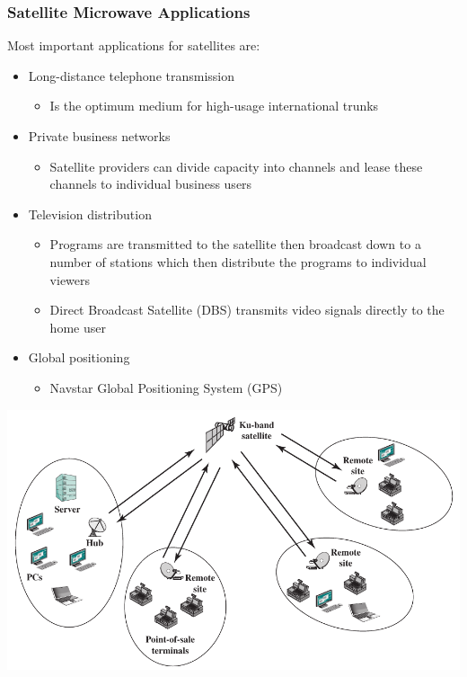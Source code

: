 \documentclass[pdflatex,compress]{beamer}
\begin{document}
\begin{frame}
	\frametitle{Satellite Microwave Applications}
	Most important applications for satellites are:
	\begin{itemize}
		\item Long-distance telephone transmission
		\begin{itemize}
			\item Is the optimum medium for high-usage international trunks
		\end{itemize}
		\item Private business networks
		\begin{itemize}
			\item Satellite providers can divide capacity into channels and lease these channels to individual business users
		\end{itemize}
		\item Television distribution
		\begin{itemize}
			\item Programs are transmitted to the satellite then broadcast down to a number of stations which then distribute the programs to individual viewers
			\item Direct Broadcast Satellite (DBS) transmits video signals directly to the home user
		\end{itemize}
		\item Global positioning
		\begin{itemize}
			\item Navstar Global Positioning System (GPS)
		\end{itemize}
	\end{itemize}
\end{frame}

\begin{frame}
	\begin{center}
		\includegraphics[height=0.8\textheight]{img/img21}
	\end{center}
\end{frame}
\end{document}
